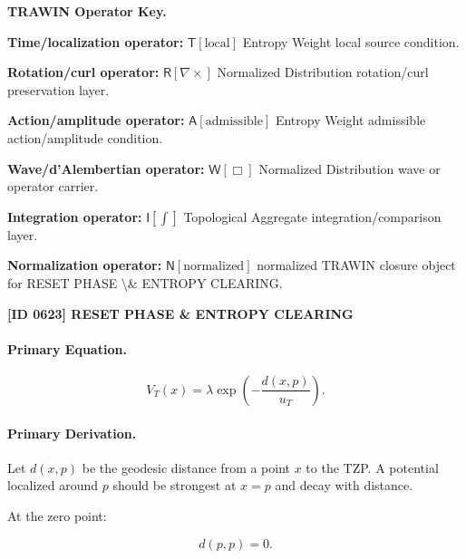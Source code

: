 \par\vspace{0.45\baselineskip}
\noindent\begin{minipage}[t]{\linewidth}
\begingroup
\small
\raggedright
\textbf{TRAWIN Operator Key.}\par
\noindent\textbf{Time/localization operator:} $\mathsf{T}\!\left[\mathrm{local}\right]$ Entropy Weight local source condition.\par
\noindent\textbf{Rotation/curl operator:} $\mathsf{R}\!\left[\nabla\times\right]$ Normalized Distribution rotation/curl preservation layer.\par
\noindent\textbf{Action/amplitude operator:} $\mathsf{A}\!\left[\mathrm{admissible}\right]$ Entropy Weight admissible action/amplitude condition.\par
\noindent\textbf{Wave/d'Alembertian operator:} $\mathsf{W}\!\left[\Box\right]$ Normalized Distribution wave or operator carrier.\par
\noindent\textbf{Integration operator:} $\mathsf{I}\!\left[\int\right]$ Topological Aggregate integration/comparison layer.\par
\noindent\textbf{Normalization operator:} $\mathsf{N}\!\left[\mathrm{normalized}\right]$ normalized TRAWIN closure object for RESET PHASE \textbackslash{}\& ENTROPY CLEARING.\par
\endgroup
\end{minipage}

\clearpage
\noindent\textbf{[ID 0623] RESET PHASE \& ENTROPY CLEARING}\par
\vspace{0.35em}
\paragraph{Primary Equation.}
\begin{equation}
V_T(x)
=
\lambda
\exp\left(
-\frac{d(x,p)}{u_T}
\right).
\end{equation}

\paragraph{Primary Derivation.}
Let $d(x,p)$ be the geodesic distance from a point $x$ to the TZP.  
A potential localized around $p$ should be strongest at $x=p$ and decay with distance.

At the zero point:

\begin{equation}
d(p,p)=0 .
\end{equation}


